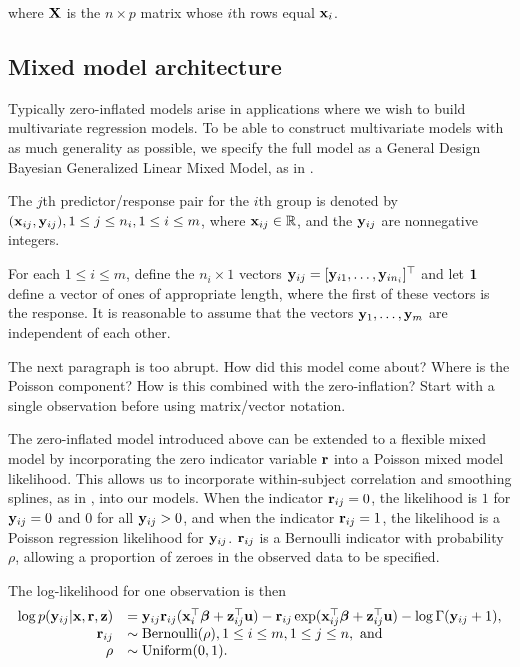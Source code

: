 \documentclass{amsart}[12pt]
\newcommand{\joc}[1]{{\color{red}#1}}
\begin{document}
\noindent where ${\bf X}$ is the $n\times p$ matrix whose $i$th rows equal ${\bf x}_i$.

\subsection{Mixed model architecture}

Typically zero-inflated models arise in applications where we wish to build multivariate regression models. To
be able to construct multivariate models with as much generality as possible, we specify the full model as a
General Design Bayesian Generalized Linear Mixed Model, as in \citep{Zhao2006}.

The $j$th predictor/response pair for the $i$th group is denoted by $({\bf x}_{ij}, {\bf y}_{ij}), 1 \leq j \leq n_i, 1 \leq i \leq m$, where ${\bf x}_{ij} \in {\mathbb{R}}$, and the ${\bf y}_{ij}$ are nonnegative integers.

For each $1 \leq i \leq m$, define the $n_i \times 1$ vectors ${\bf y}_{ij} = [{\bf y}_{i 1}, \ldots, {\bf y}_{i
	n_i}]^\top$ and let ${\bf 1}$ define a vector of ones of appropriate length, where the first of these vectors is
the response. It is reasonable to assume that the vectors ${\bf y}_1, \ldots, {\bf y}_m$ are independent of each
other.

\joc{The next paragraph is too abrupt. How did this model come about? Where is the Poisson component? How is this combined with the zero-inflation?
Start with a single observation before using matrix/vector notation.}

The zero-inflated model introduced above can be extended to a flexible mixed model by incorporating the zero
indicator variable ${\bf r}$ into a Poisson mixed model likelihood. This allows us to incorporate within-subject
correlation and smoothing splines, as in \citep{Wand2008}, into our models. When the indicator ${\bf r}_{ij} = 0$,
the likelihood is $1$ for ${\bf y}_{ij} = 0$ and $0$ for all ${\bf y}_{ij} > 0$, and when the indicator ${\bf r}_{ij} =
1$, the likelihood is a Poisson regression likelihood for ${\bf y}_{ij}$. ${\bf r}_{ij}$ is a Bernoulli indicator with
probability $\rho$, allowing a proportion of zeroes in the observed data to be specified.

The log-likelihood for one observation is then
\[
	\begin{array}{rl}
		\log p({\bf y}_{ij} | {\bf x}, {\bf r}, {\bf z}) & = {\bf y}_{ij} {\bf r}_{ij} ({\bf x}_i^\top {\boldsymbol\beta} + {\bf z}_{ij}^\top {\bf u}) - {\bf r}_{ij} \exp ({\bf x}_{ij}^\top {\boldsymbol\beta} + {\bf z}_{ij}^\top {\bf u}) - \log \Gamma ({\bf y}_{ij} + 1), \\
		{\bf r}_{ij}                         & \sim \text{Bernoulli}(\rho), 1 \leq i \leq m, 1 \leq j \leq n, \text{ and }                                                              \\
		\rho                        & \sim \mbox{Uniform}(0, 1).                                                                                              \\
	\end{array}
\]
\end{document}
